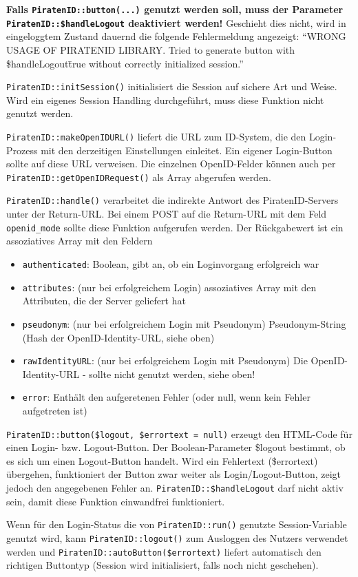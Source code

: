 \textbf{Falls \texttt{PiratenID::button(...)} genutzt werden soll, muss der Parameter \texttt{PiratenID::\$handleLogout} deaktiviert werden!}
Geschieht dies nicht, wird in eingeloggtem Zustand dauernd die folgende Fehlermeldung angezeigt:
"`WRONG USAGE OF PIRATENID LIBRARY. Tried to generate button with \$handleLogout\=true without correctly initialized session."'

\texttt{PiratenID::initSession()} initialisiert die Session auf sichere Art und Weise.
Wird ein eigenes Session Handling durchgeführt, muss diese Funktion nicht genutzt werden.

\texttt{PiratenID::makeOpenIDURL()} liefert die URL zum ID-System, die den Login-Prozess mit den derzeitigen Einstellungen einleitet.
Ein eigener Login-Button sollte auf diese URL verweisen.
Die einzelnen OpenID-Felder können auch per \texttt{PiratenID::getOpenIDRequest()} als Array abgerufen werden.

\texttt{PiratenID::handle()} verarbeitet die indirekte Antwort des PiratenID-Servers unter der Return-URL.
Bei einem POST auf die Return-URL mit dem Feld \texttt{openid\_mode} sollte diese Funktion aufgerufen werden.
Der Rückgabewert ist ein assoziatives Array mit den Feldern 
\begin{itemize}
	\item \texttt{authenticated}: Boolean, gibt an, ob ein Loginvorgang erfolgreich war
	\item \texttt{attributes}: (nur bei erfolgreichem Login) assoziatives Array mit den Attributen, die der Server geliefert hat
	\item \texttt{pseudonym}: (nur bei erfolgreichem Login mit Pseudonym) Pseudonym-String (Hash der OpenID-Identity-URL, siehe oben)
	\item \texttt{rawIdentityURL}: (nur bei erfolgreichem Login mit Pseudonym) Die OpenID-Identity-URL - sollte nicht genutzt werden, siehe oben!
	\item \texttt{error}: Enthält den aufgeretenen Fehler (oder null, wenn kein Fehler aufgetreten ist)
\end{itemize}

\texttt{PiratenID::button(\$logout, \$errortext = null)} erzeugt den HTML-Code für einen Login- bzw. Logout-Button.
Der Boolean-Parameter \$logout bestimmt, ob es sich um einen Logout-Button handelt.
Wird ein Fehlertext (\$errortext) übergehen, funktioniert der Button zwar weiter als Login/Logout-Button,
zeigt jedoch den angegebenen Fehler an.
\texttt{PiratenID::\$handleLogout} darf nicht aktiv sein, damit diese Funktion einwandfrei funktioniert.

Wenn für den Login-Status die von \texttt{PiratenID::run()} genutzte Session-Variable genutzt wird,
kann \texttt{PiratenID::logout()} zum Ausloggen des Nutzers verwendet werden und
\texttt{PiratenID::autoButton(\$errortext)} liefert automatisch den richtigen Buttontyp
(Session wird initialisiert, falls noch nicht geschehen).
